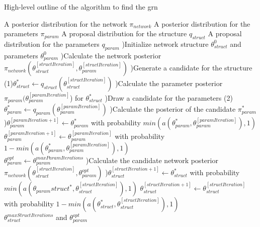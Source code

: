 \begin{algorithm}
\label{alg:find_grn}
\caption{High-level outline of the algorithm to find the grn}
\begin{algorithmic}
  \Require A posterior distribution for the network $\pi_{network}$
  \Require A posterior distribution for the parameters $\pi_{param}$
  \Require A proposal distribution for the structure $q_{struct}$
  \Require A proposal distribution for the parameters $q_{param}$
  )Initialize network structure $\theta_{struct}^0$ and parameters $\theta_{param}^0$
  )Calculate the network posterior $\pi_{network}(\theta_{struct}^{[structIteration]}, \theta_{param}^{[structIteration]})$ 
  )Generate a candidate for the structure (1)$\theta_{struct}^{*} \leftarrow q_{struct}(\theta_{struct}^{[structIteration]})$
  )Calculate the parameter posterior $\pi_{param}(\theta_{param}^{[paramIteration]}$) for $\theta_{struct}^{*}$
  )Draw a candidate for the parameters 
  \State (2)$\theta_{param}^{*} \leftarrow q_{param}(\theta_{param}^{[paramIteration]})$
  )Calculate the posterior of the candidate $\pi_{param}^{*}$
  )$\theta_{param}^{[paramIteration+1]} \leftarrow \theta_{param}^{*} $ 
\State with probability $min({a(\theta_{param}^{*}, \theta_{param}^{[paramIteration]}), 1})$ 
\State   $\theta_{param}^{[paramIteration+1]} \leftarrow \theta_{param}^{[paramIteration]} $ 
\State  with probability $ 1 - min({a(\theta_{param}^{*}, \theta_{param}^{[paramIteration]}), 1})$ 
  \EndFor \\
  \State $\theta_{param}^{opt} \leftarrow \theta_{param}^{maxParamIterations}$
  )Calculate the candidate network posterior 
\State $\pi_{network}(\theta_{struct}^{[structIteration]}, \theta_{param}^{opt})$ 
  )$\theta_{struct}^{[structIteration+1]} \leftarrow \theta_{struct}^{*} $ 
\State with probability $min({a(\theta_{param}struct^{*}, \theta_{struct}^{[structIteration]}), 1})$ 
\State  $\theta_{struct}^{[structIteration+1]} \leftarrow \theta_{struct}^{[structIteration]} $ 
\State with probability $ 1 - min({a(\theta_{struct}^{*}, \theta_{struct}^{[structIteration]}), 1})$
  \EndFor \\
  \Return $\theta_{struct}^{maxStructIterations}$ and $\theta_{param}^{opt}$
  \EndFunction
\end{algorithmic}
\end{algorithm}
